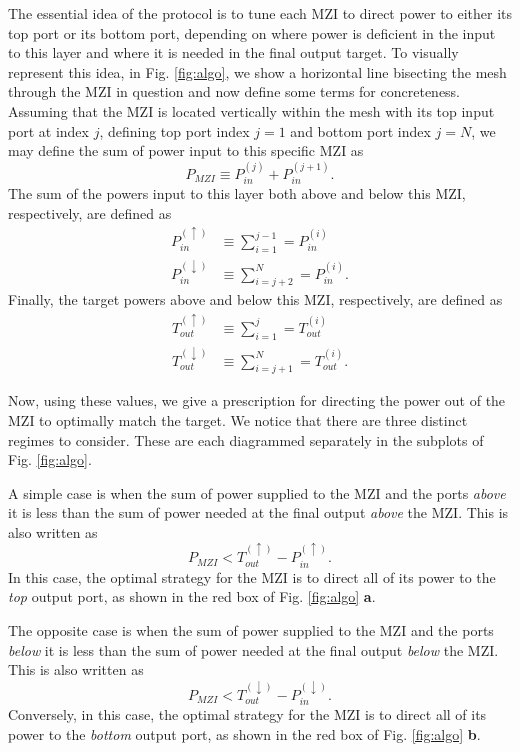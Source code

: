\documentclass[%
 reprint,
 amsmath,amssymb,
 aps,
prstab,
floatfix,
]{revtex4-1}
\begin{document}
The essential idea of the protocol is to tune each MZI to direct power to either its top port or its bottom port, depending on where power is deficient in the input to this layer and where it is needed in the final output target. To visually represent this idea, in Fig. \ref{fig:algo}, we show a horizontal line bisecting the mesh through the MZI in question and now define some terms for concreteness.  Assuming that the MZI is located vertically within the mesh with its top input  port at index $j$, defining top port index $j=1$ and bottom port index $j=N$, we may define the sum of power input to this specific MZI as
\begin{equation}
    P_{MZI} \equiv P_{in}^{(j)} + P_{in}^{(j+1)}.
\end{equation}
The sum of the powers input to this layer both above and below this MZI, respectively, are defined as
\begin{align}
    P_{in}^{(\uparrow)} &\equiv \sum_{i=1}^{j-1} = P_{in}^{(i)} \\
    P_{in}^{(\downarrow)} &\equiv \sum_{i=j+2}^N = P_{in}^{(i)}.
\end{align}
Finally, the target powers above and below this MZI, respectively, are defined as
\begin{align}
    T_{out}^{(\uparrow)} &\equiv \sum_{i=1}^j = T_{out}^{(i)} \\
    T_{out}^{(\downarrow)} &\equiv \sum_{i=j+1}^N = T_{out}^{(i)}.
\end{align}

Now, using these values, we give a prescription for directing the power out of the MZI to optimally match the target.  We notice that there are three distinct regimes to consider.  These are each diagrammed separately in the subplots of Fig. \ref{fig:algo}.  

A simple case is when the sum of power supplied to the MZI and the ports \textit{above} it is less than the sum of power needed at the final output \textit{above} the MZI.  This is also written as
\begin{equation}
    P_{MZI} < T_{out}^{(\uparrow)} -  P_{in}^{(\uparrow)}.
\end{equation}
In this case, the optimal strategy for the MZI is to direct all of its power to the \textit{top} output port, as shown in the red box of Fig. \ref{fig:algo} \textbf{a}.

The opposite case is when the sum of power supplied to the MZI and the ports \textit{below} it is less than the sum of power needed at the final output \textit{below} the MZI.  This is also written as
\begin{equation}
    P_{MZI} < T_{out}^{(\downarrow)} - P_{in}^{(\downarrow)}.
\end{equation}
Conversely, in this case, the optimal strategy for the MZI is to direct all of its power to the \textit{bottom} output port, as shown in the red box of Fig. \ref{fig:algo} \textbf{b}.
\end{document}
